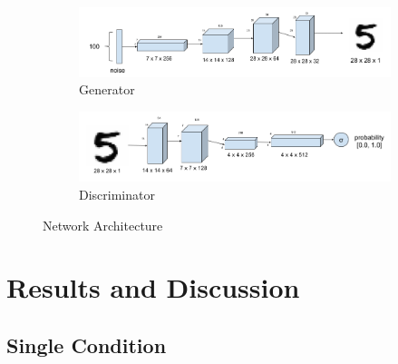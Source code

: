 \documentclass[11pt, letterpaper, oneside]{article}
\begin{document}

\begin{figure}
    \begin{subfigure}{.5\textwidth}
      \centering
      \includegraphics[width=1\linewidth]{generatorArch.png}  
      \caption{Generator}
      \label{fig:sub-first}
    \end{subfigure}
    \begin{subfigure}{.5\textwidth}
      \centering
      \includegraphics[width=1\linewidth]{discriminatorArch.png}  
      \caption{Discriminator}
      \label{fig:sub-second}
    \end{subfigure}

\caption{Network Architecture}
\label{fig:fig}
\end{figure}
  

\section{Results and Discussion} \label{Results_Discussion}

\subsection{Single Condition}
\end{document}
